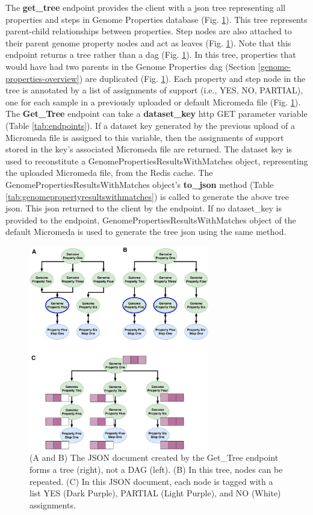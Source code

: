 The \textbf{get\_tree} endpoint provides the client with a \gls{json} tree representing all properties and steps in Genome Properties database (Fig. \ref{fig:tree-json}). This tree represents parent-child relationships between properties. Step nodes are also attached to their parent genome property nodes and act as leaves (Fig. \ref{fig:tree-json}). Note that this endpoint returns a tree rather than a \gls{dag} (Fig. \ref{fig:tree-json}). In this tree, properties that would have had two parents in the Genome Properties \gls{dag} (Section \ref{genome-properties-overview}) are duplicated (Fig. \ref{fig:tree-json}). Each property and step node in the tree is annotated by a list of assignments of support (i.e., YES, NO, PARTIAL), one for each sample in a previously uploaded or default Micromeda file (Fig. \ref{fig:tree-json}). The \textbf{Get\_Tree} endpoint can take a \textbf{dataset\_key} \gls{http} GET parameter variable (Table \ref{tab:endpoints}). If a dataset key generated by the previous upload of a Micromeda file is assigned to this variable, then the assignments of support stored in the key's associated Micromeda file are returned. The dataset key is used to reconstitute a GenomePropertiesResultsWithMatches object, representing the uploaded Micromeda file, from the Redis cache. The GenomePropertiesResultsWithMatches object's \textbf{to\_json} method (Table \ref{tab:genomepropertyresultswithmatches}) is called to generate the above tree \gls{json}. This \gls{json} returned to the client by the endpoint. If no dataset\_key is provided to the endpoint, GenomePropertiesResultsWithMatches object of the default Micromeda is used to generate the tree \gls{json} using the same method.

\begin{figure}[!ht]
  \centering
	\includegraphics[width=0.70\textwidth]{media/Tree-JSON.pdf}
	 \caption{(A and B) The JSON document created by the Get\_Tree endpoint forms a tree (right), not a DAG (left). (B) In this tree, nodes can be repeated. (C) In this JSON document, each node is tagged with a list YES (Dark Purple), PARTIAL (Light Purple), and NO (White) assignments.}
	 \label{fig:tree-json}
\end{figure}


